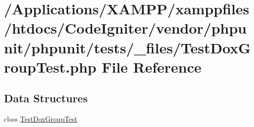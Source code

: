 \hypertarget{_test_dox_group_test_8php}{}\section{/\+Applications/\+X\+A\+M\+P\+P/xamppfiles/htdocs/\+Code\+Igniter/vendor/phpunit/phpunit/tests/\+\_\+files/\+Test\+Dox\+Group\+Test.php File Reference}
\label{_test_dox_group_test_8php}
\subsection*{Data Structures}
\begin{DoxyCompactItemize}
\item 
class \mbox{\hyperlink{class_test_dox_group_test}{Test\+Dox\+Group\+Test}}
\end{DoxyCompactItemize}
